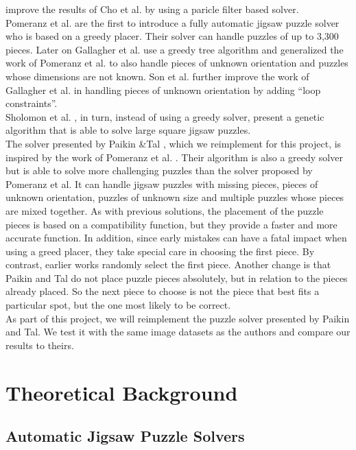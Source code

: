 \documentclass[]{report}
\begin{document}
\cite{yang2011particle} improve the results of Cho et al. by using a paricle filter
based solver. \\
Pomeranz et al. \cite{Pomeranz2011} are the first to introduce a fully
automatic jigsaw puzzle solver who is based on a greedy placer. Their solver
can handle puzzles of up to 3,300 pieces. Later on Gallagher et al.
\cite{gallagher2012jigsaw} use a greedy tree algorithm and generalized the work
of Pomeranz et al. to also handle pieces of unknown orientation and puzzles
whose dimensions are not known. Son et al. \cite{son2014solving} further
improve the work of Gallagher et al. in handling pieces of unknown orientation
by adding ``loop constraints''. \\
Sholomon et al. \cite{sholomon2013genetic}, in turn, instead of using a greedy
solver, present a genetic algorithm that is able to solve large square jigsaw
puzzles. \\
The solver presented by Paikin \&Tal \cite{Paikin2015}, which we reimplement for
this project, is inspired by the work of Pomeranz et al. \cite{Pomeranz2011}.
Their algorithm is also a greedy solver but is able to solve more challenging
puzzles than the solver proposed by Pomeranz et al. It can handle jigsaw puzzles with
missing pieces, pieces of unknown orientation, puzzles of unknown size and
multiple puzzles whose pieces are mixed together. As with previous solutions,
the placement of the puzzle pieces is based on a compatibility function, but
they provide a faster and more accurate function. In addition, since early
mistakes can have a fatal impact when using a greed placer, they take special
care in choosing the first piece. By contrast, earlier works randomly select the
first piece. Another change is that Paikin and Tal do not place puzzle pieces
absolutely, but in relation to the pieces already placed. So the next piece to
choose is not the piece that best fits a particular spot, but the one most
likely to be correct.\\
As part of this project, we will reimplement the puzzle solver presented by
Paikin and Tal. We test it with the same image datasets as the authors and
compare our results to theirs.


\chapter{Theoretical Background}
\section{Automatic Jigsaw Puzzle Solvers}
\end{document}
